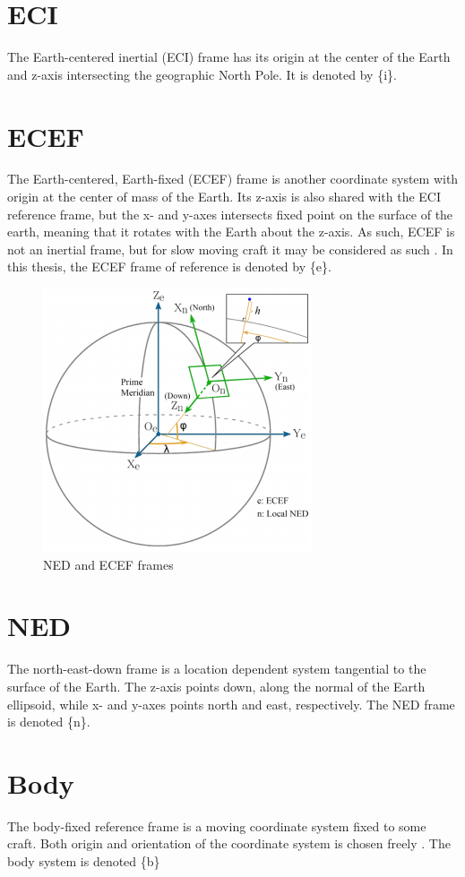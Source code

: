 
\section{ECI}
    The Earth-centered inertial (ECI) frame has its origin at the center of the Earth and z-axis intersecting the geographic North Pole. It is denoted by \{i\}.
    

\section{ECEF}
    The Earth-centered, Earth-fixed (ECEF) frame is another coordinate system with origin at the center of mass of the Earth. Its z-axis is also shared with the ECI reference frame, but the x- and y-axes intersects fixed point on the surface of the earth, meaning that it rotates with the Earth about the z-axis. As such, ECEF is not an inertial frame, but for slow moving craft it may be considered as such \cite{fossen2011handbook}. In this thesis, the ECEF frame of reference is denoted by \{e\}. 
    
    \begin{figure}
        \centering
        \includegraphics[scale=1]{Appendices/bilder/ECEF_ENU_BETTER.png}
        \caption{NED and ECEF frames}
        \label{fig:ecef-enu}
    \end{figure}
    
\section{NED}
    The north-east-down frame is a location dependent system tangential to the surface of the Earth. The z-axis points down, along the normal of the Earth ellipsoid, while x- and y-axes points north and east, respectively. The NED frame is denoted \{n\}.

\section{Body}
    The body-fixed reference frame is a moving coordinate system fixed to some craft. Both origin and orientation of the coordinate system is chosen freely . The body system is denoted \{b\}